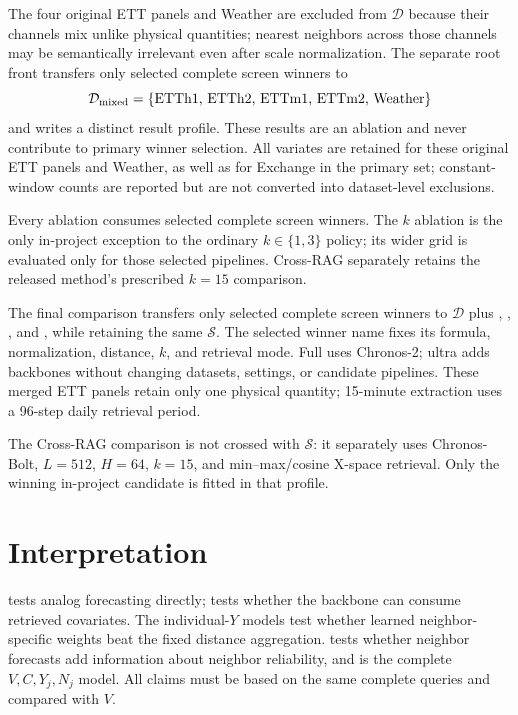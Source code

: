 \documentclass[10pt]{article}
\begin{document}
The four original ETT panels and Weather are excluded from $\mathcal D$ because their channels mix
unlike physical quantities; nearest neighbors across those channels may be
semantically irrelevant even after scale normalization. The separate root
front  transfers only selected complete
screen winners to
\[
 \mathcal D_{\rm mixed}=\{\text{ETTh1, ETTh2, ETTm1, ETTm2, Weather}\}
\]
and writes a distinct  result profile. These
results are an ablation and never contribute to primary winner selection.
All variates are retained for these original ETT panels and Weather, as well as
for Exchange in the primary set; constant-window counts are reported but are
not converted into dataset-level exclusions.

Every ablation consumes selected complete screen winners. The $k$ ablation is
the only in-project exception to the ordinary $k\in\{1,3\}$ policy; its wider
grid is evaluated only for those selected pipelines. Cross-RAG separately
retains the released method's prescribed $k=15$ comparison.

The final  comparison transfers only selected complete
screen winners to $\mathcal D$ plus , ,
, and , while retaining the same
$\mathcal S$. The selected winner name fixes its formula, normalization,
distance, $k$, and retrieval mode. Full uses Chronos-2; ultra adds backbones
without changing datasets, settings, or candidate pipelines. These merged ETT
panels retain only one physical quantity; 15-minute extraction uses a 96-step
daily retrieval period.

The Cross-RAG comparison is not crossed with $\mathcal S$: it separately uses
Chronos-Bolt, $L=512$, $H=64$, $k=15$, and min--max/cosine X-space retrieval.
Only the winning in-project candidate is fitted in that profile.

\section{Interpretation}
 tests analog forecasting directly;  tests whether
the backbone can consume retrieved covariates. The individual-$Y$ models test
whether learned neighbor-specific weights beat the fixed distance aggregation.
 tests whether neighbor forecasts add information about neighbor
reliability, and  is the complete $V,C,Y_j,N_j$ model. All claims
must be based on the same complete \Tthree queries and compared with $V$.
\end{document}
